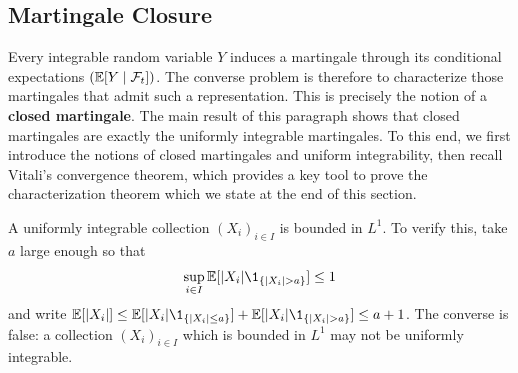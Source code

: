 \documentclass[../Main.tex]{subfiles}
\begin{document}

\subsection{Martingale Closure} \label{sec:uniform_integrability}
Every integrable random variable $Y$ induces a martingale through its conditional expectations $(\mathbb{E}[Y\mid\mathcal{F}_t])$. The converse problem is therefore to characterize those martingales that admit such a representation. This is precisely the notion of a \textbf{closed martingale}. The main result of this paragraph shows that closed martingales are exactly the uniformly integrable martingales. To this end, we first introduce the notions of closed martingales and uniform integrability, then recall Vitali's convergence theorem, which provides a key tool to prove the characterization theorem which we state at the end of this section.

A uniformly integrable collection $(X_i)_{i \in I}$ is bounded in $L^1$. To verify this, take $a$ large enough so that
\[ \sup_{i \in I} \EE[|X_i| \1_{\{|X_i| > a\}}] \leq 1 \]
and write $\EE[|X_i|] \leq \EE[|X_i| \1_{\{|X_i| \leq a\}}] + \EE[|X_i| \1_{\{|X_i| > a\}}] \leq a + 1$. The converse is false: a collection $(X_i)_{i \in I}$ which is bounded in $L^1$ may not be uniformly integrable.
\end{document}
